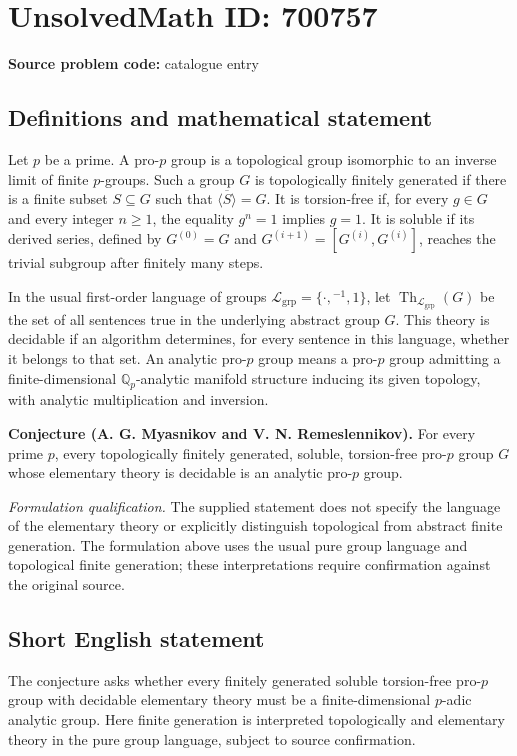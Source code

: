 \documentclass[11pt]{article}
\newcommand{\Q}{\mathbb{Q}}
\begin{document}
\section*{UnsolvedMath ID: 700757}
\textbf{Source problem code:} catalogue entry
\subsection{Definitions and mathematical statement}
Let \(p\) be a prime. A pro-\(p\) group is a topological group isomorphic to an inverse limit of finite \(p\)-groups. Such a group \(G\) is topologically finitely generated if there is a finite subset \(S\subseteq G\) such that \(\overline{\langle S\rangle}=G\). It is torsion-free if, for every \(g\in G\) and every integer \(n\geq 1\), the equality \(g^n=1\) implies \(g=1\). It is soluble if its derived series, defined by \(G^{(0)}=G\) and \(G^{(i+1)}=[G^{(i)},G^{(i)}]\), reaches the trivial subgroup after finitely many steps.

In the usual first-order language of groups \(\mathcal L_{\mathrm{grp}}=\{\cdot,{}^{-1},1\}\), let \(\operatorname{Th}_{\mathcal L_{\mathrm{grp}}}(G)\) be the set of all sentences true in the underlying abstract group \(G\). This theory is decidable if an algorithm determines, for every sentence in this language, whether it belongs to that set. An analytic pro-\(p\) group means a pro-\(p\) group admitting a finite-dimensional \(\Q_p\)-analytic manifold structure inducing its given topology, with analytic multiplication and inversion.

\textbf{Conjecture (A. G. Myasnikov and V. N. Remeslennikov).} For every prime \(p\), every topologically finitely generated, soluble, torsion-free pro-\(p\) group \(G\) whose elementary theory is decidable is an analytic pro-\(p\) group.

\textit{Formulation qualification.} The supplied statement does not specify the language of the elementary theory or explicitly distinguish topological from abstract finite generation. The formulation above uses the usual pure group language and topological finite generation; these interpretations require confirmation against the original source.
\subsection{Short English statement}
The conjecture asks whether every finitely generated soluble torsion-free pro-\(p\) group with decidable elementary theory must be a finite-dimensional \(p\)-adic analytic group. Here finite generation is interpreted topologically and elementary theory in the pure group language, subject to source confirmation.
\end{document}
